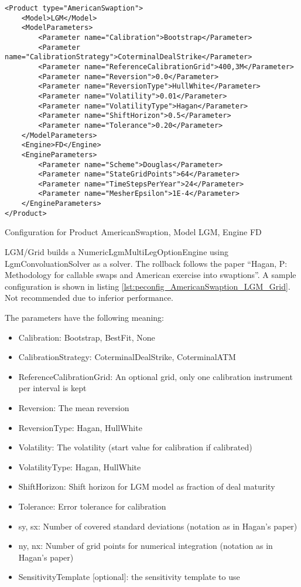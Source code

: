 \begin{longlisting}
\begin{verbatim}
<Product type="AmericanSwaption">
    <Model>LGM</Model>
    <ModelParameters>
        <Parameter name="Calibration">Bootstrap</Parameter>
        <Parameter name="CalibrationStrategy">CoterminalDealStrike</Parameter>
        <Parameter name="ReferenceCalibrationGrid">400,3M</Parameter>
        <Parameter name="Reversion">0.0</Parameter>
        <Parameter name="ReversionType">HullWhite</Parameter>
        <Parameter name="Volatility">0.01</Parameter>
        <Parameter name="VolatilityType">Hagan</Parameter>
        <Parameter name="ShiftHorizon">0.5</Parameter>
        <Parameter name="Tolerance">0.20</Parameter>
    </ModelParameters>
    <Engine>FD</Engine>
    <EngineParameters>
        <Parameter name="Scheme">Douglas</Parameter>
        <Parameter name="StateGridPoints">64</Parameter>
        <Parameter name="TimeStepsPerYear">24</Parameter>
        <Parameter name="MesherEpsilon">1E-4</Parameter>
    </EngineParameters>
</Product>
\end{verbatim}
\caption{Configuration for Product AmericanSwaption, Model LGM, Engine FD}
\label{lst:peconfig_AmericanSwaption_LGM_FD}
\end{longlisting}

LGM/Grid builds a NumericLgmMultiLegOptionEngine using LgmConvoluationSolver as a solver. The rollback follows the paper
``Hagan, P: Methodology for callable swaps and American exercise into swaptions''. A sample configuration is shown in
listing \ref{lst:peconfig_AmericanSwaption_LGM_Grid}. Not recommended due to inferior performance.

The parameters have the following meaning:

\begin{itemize}
\item Calibration: Bootstrap, BestFit, None
\item CalibrationStrategy: CoterminalDealStrike, CoterminalATM
\item ReferenceCalibrationGrid: An optional grid, only one calibration instrument per interval is kept
\item Reversion: The mean reversion
\item ReversionType: Hagan, HullWhite
\item Volatility: The volatility (start value for calibration if calibrated)
\item VolatilityType: Hagan, HullWhite
\item ShiftHorizon: Shift horizon for LGM model as fraction of deal maturity
\item Tolerance: Error tolerance for calibration
\item sy, sx: Number of covered standard deviations (notation as in Hagan's paper)
\item ny, nx: Number of grid points for numerical integration (notation as in Hagan's paper)
\item SensitivityTemplate [optional]: the sensitivity template to use 
\end{itemize}

